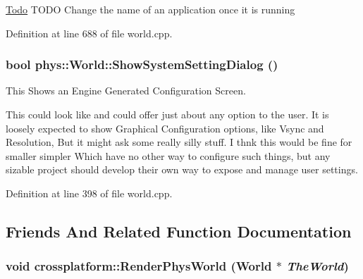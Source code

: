 \begin{Desc}
\item[\hyperlink{todo__todo000019}{Todo}]TODO Change the name of an application once it is running \end{Desc}




Definition at line 688 of file world.cpp.

\hypertarget{classphys_1_1World_a0d8ce136bebe81a6826b7e202a531f6a}{
\subsubsection[{ShowSystemSettingDialog}]{\setlength{\rightskip}{0pt plus 5cm}bool phys::World::ShowSystemSettingDialog ()}}
\label{da/ddf/classphys_1_1World_a0d8ce136bebe81a6826b7e202a531f6a}


This Shows an Engine Generated Configuration Screen. 

This could look like and could offer just about any option to the user. It is loosely expected to show Graphical Configuration options, like Vsync and Resolution, But it might ask some really silly stuff. I thnk this would be fine for smaller simpler Which have no other way to configure such things, but any sizable project should develop their own way to expose and manage user settings. 

Definition at line 398 of file world.cpp.



\subsection{Friends And Related Function Documentation}
\hypertarget{classphys_1_1World_ac7946bdb41c7884bcd7cfdec2b5358f0}{
\subsubsection[{crossplatform::RenderPhysWorld}]{\setlength{\rightskip}{0pt plus 5cm}void crossplatform::RenderPhysWorld ({\bf World} $\ast$ {\em TheWorld})}}
\label{da/ddf/classphys_1_1World_ac7946bdb41c7884bcd7cfdec2b5358f0}


